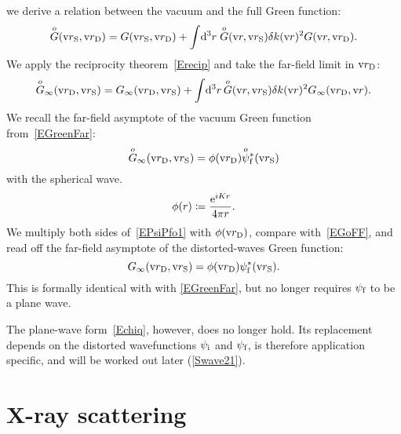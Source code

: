 we derive a relation between the vacuum and the full Green function:
\begin{equation}\label{EGGo1}
  \Go(\rS,\rD) = G(\rS,\rD) + \int\!\d^3r\;\Go(\r,\rS)\delta k(\r)^2G(\r,\rD).
\end{equation}
We apply the reciprocity theorem~\cref{Erecip} and take the far-field limit in $\rD$:
\begin{equation}\label{EGoFF}
  \Go_\infty(\rD,\rS) = G_\infty(\rD,\rS) + \int\!\d^3r\, \Go(\r,\rS)\delta k(\r)^2 G_\infty(\rD,\r).
\end{equation}
We recall the far-field asymptote of the vacuum Green function from~\cref{EGreenFar}:
\begin{equation}
  \Go_\infty(\rD,\rS) = \phi(\rD)\pfoc(\rS)
\end{equation}
with the spherical wave.
\begin{equation}\label{Effphidef}
  \phi(r) \coloneqq \frac{\e^{iKr}}{4\pi r}.
\end{equation}
We multiply both sides of~\cref{EPsiPfo1} with $\phi(\rD)$,
compare with~\cref{EGoFF},
and read off the far-field asymptote of the distorted-waves Green function:
\begin{equation}\label{EGiDWBA}
  G_\infty(\rD,\rS) = \phi(\rD)\psi^*_\sf(\rS).
\end{equation}
This is formally identical with with \cref{EGreenFar},
but no longer requires $\psi_\sf$ to be a plane wave.
%

%
%
%
%
The plane-wave form~\cref{Echiq}, however, does no longer hold.
Its replacement depends on the distorted wavefunctions
$\psi_\si$ and $\psi_\sf$,
is therefore application specific,
and will be worked out later (\cref{Swave21}).

%

\section{X-ray scattering}\label{SXray}
%

